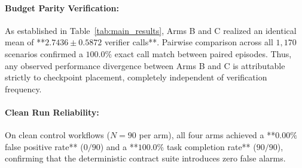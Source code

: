 \begin{table}[t]
\centering
\footnotesize
\caption{Main Experimental Results Across Verification Scheduling Conditions (Run ID: \texttt{final\_exp\_20261104\_015549\_5fcb5a61}).}
\label{tab:main_results}
\setlength{\tabcolsep}{4pt}
\end{table}

\paragraph{Budget Parity Verification:}
As established in Table~\ref{tab:main_results}, Arms B and C realized an identical mean of **$2.7436 \pm 0.5872$ verifier calls**. Pairwise comparison across all $1,170$ scenarios confirmed a $100.0\%$ exact call match between paired episodes. Thus, any observed performance divergence between Arms B and C is attributable strictly to checkpoint placement, completely independent of verification frequency.

\paragraph{Clean Run Reliability:}
On clean control workflows ($N=90$ per arm), all four arms achieved a **$0.00\%$ false positive rate** ($0/90$) and a **$100.0\%$ task completion rate** ($90/90$), confirming that the deterministic contract suite introduces zero false alarms.

